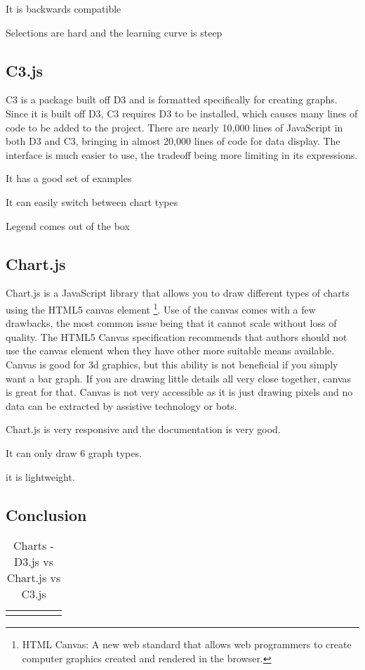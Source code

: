 \documentclass[draftclsnofoot,onecolumn,letterpaper,10pt,compsoc]{IEEEtran}
\begin{document}
  It is backwards compatible

  Selections are hard and the learning curve is steep

  \subsection{C3.js}
  C3 is a package built off D3 and is formatted specifically for creating graphs.
  Since it is built off D3, C3 requires D3 to be installed, which causes many lines of code to be added to the project.
  There are nearly 10,000 lines of JavaScript in both D3 and C3, bringing in almost 20,000 lines of code for data display.
  The interface is much easier to use, the tradeoff being more limiting in its expressions.

  It has a good set of examples

  It can easily switch between chart types

  Legend comes out of the box

  \subsection{Chart.js}
  Chart.js is a JavaScript library that allows you to draw different types of charts using the HTML5 canvas element
  \footnote{HTML Canvas: A new web standard that allows web programmers to create computer graphics created and rendered in the browser.}.
  Use of the canvas comes with a few drawbacks, the most common issue being that it cannot scale without loss of quality.
  The HTML5 Canvas specification recommends that authors should not use the canvas element when they have other more suitable means available.\cite{CanvasVsSVG}
  Canvas is good for 3d graphics, but this ability is not beneficial if you simply want a bar graph.
  If you are drawing little details all very close together, canvas is great for that.
  Canvas is not very accessible as it is just drawing pixels and no data can be extracted by assistive technology or bots.

  Chart.js is very responsive and the documentation is very good.

  It can only draw 6 graph types.

  it is lightweight.

  \subsection{Conclusion}


  \begin{landscape}
    \begin{table}[]
    \centering
    \caption{Charts - D3.js vs Chart.js vs C3.js}
    \label{my-label}
      \begin{tabular}{lllll}
        &  &  &  & \\
      \end{tabular}
    \end{table}
  \end{landscape}
\end{document}
